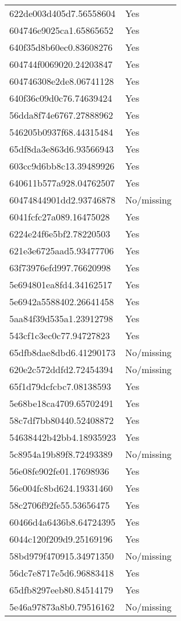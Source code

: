 \begin{tabular}{ll}
622de003d405d7.56558604 & Yes \\
604746e9025ca1.65865652 & Yes \\
640f35d8b60ec0.83608276 & Yes \\
604744f0069020.24203847 & Yes \\
604746308e2de8.06741128 & Yes \\
640f36c09d0c76.74639424 & Yes \\
56dda8f74e6767.27888962 & Yes \\
546205b0937f68.44315484 & Yes \\
65df8da3e863d6.93566943 & Yes \\
603cc9d6bb8c13.39489926 & Yes \\
640611b577a928.04762507 & Yes \\
60474844901dd2.93746878 & No/missing \\
6041fcfc27a089.16475028 & Yes \\
6224e24f6e5bf2.78220503 & Yes \\
621e3e6725aad5.93477706 & Yes \\
63f73976efd997.76620998 & Yes \\
5e694801ea8fd4.34162517 & Yes \\
5e6942a5588402.26641458 & Yes \\
5aa84f39d535a1.23912798 & Yes \\
543cf1c3ec0c77.94727823 & Yes \\
65dfb8dae8dbd6.41290173 & No/missing \\
620e2c572ddfd2.72454394 & No/missing \\
65f1d79dcfcbc7.08138593 & Yes \\
5e68be18ca4709.65702491 & Yes \\
58c7df7bb80440.52408872 & Yes \\
54638442b42bb4.18935923 & Yes \\
5c8954a19b89f8.72493389 & No/missing \\
56e08fe902fe01.17698936 & Yes \\
56e004fc8bd624.19331460 & Yes \\
58c2706f92fe55.53656475 & Yes \\
60466d4a6436b8.64724395 & Yes \\
6044c120f209d9.25169196 & Yes \\
58bd979f470915.34971350 & No/missing \\
56dc7e8717e5d6.96883418 & Yes \\
65dfb8297eeb80.84514179 & Yes \\
5e46a97873a8b0.79516162 & No/missing \\

\end{tabular}
